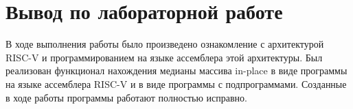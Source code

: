 \section{Вывод по лабораторной работе}
В ходе выполнения работы было произведено ознакомление с архитектурой RISC-V и программированием на языке ассемблера этой архитектуры. Был реализован функционал нахождения медианы массива in-place в виде программы на языке ассемблера RISC-V и в виде программы с подпрограммами. Созданные в ходе работы программы работают полностью исправно.
